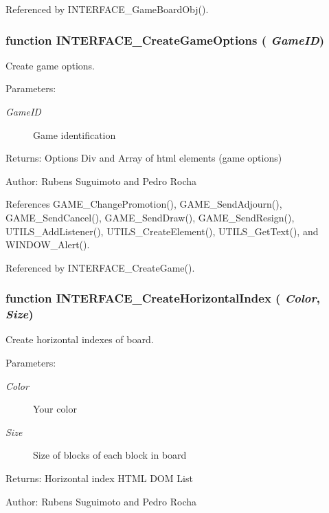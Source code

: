 Referenced by INTERFACE\_\-GameBoardObj().
\subsubsection[INTERFACE\_\-CreateGameOptions]{\setlength{\rightskip}{0pt plus 5cm}function INTERFACE\_\-CreateGameOptions ( {\em GameID})}\label{board_8js_bc5c6d2b814ec76a4fe1813446471bcd}


Create game options. 

\begin{Desc}
\item[Parameters:]
\begin{description}
\item[{\em GameID}]Game identification \end{description}
\end{Desc}
\begin{Desc}
\item[Returns:]Options Div and Array of html elements (game options) \end{Desc}
\begin{Desc}
\item[Author:]Rubens Suguimoto and Pedro Rocha \end{Desc}


References GAME\_\-ChangePromotion(), GAME\_\-SendAdjourn(), GAME\_\-SendCancel(), GAME\_\-SendDraw(), GAME\_\-SendResign(), UTILS\_\-AddListener(), UTILS\_\-CreateElement(), UTILS\_\-GetText(), and WINDOW\_\-Alert().

Referenced by INTERFACE\_\-CreateGame().
\subsubsection[INTERFACE\_\-CreateHorizontalIndex]{\setlength{\rightskip}{0pt plus 5cm}function INTERFACE\_\-CreateHorizontalIndex ( {\em Color}, \/   {\em Size})}\label{board_8js_cbdc49f0062e433a07b51d70f8f6173c}


Create horizontal indexes of board. 

\begin{Desc}
\item[Parameters:]
\begin{description}
\item[{\em Color}]Your color \item[{\em Size}]Size of blocks of each block in board \end{description}
\end{Desc}
\begin{Desc}
\item[Returns:]Horizontal index HTML DOM List \end{Desc}
\begin{Desc}
\item[Author:]Rubens Suguimoto and Pedro Rocha \end{Desc}


